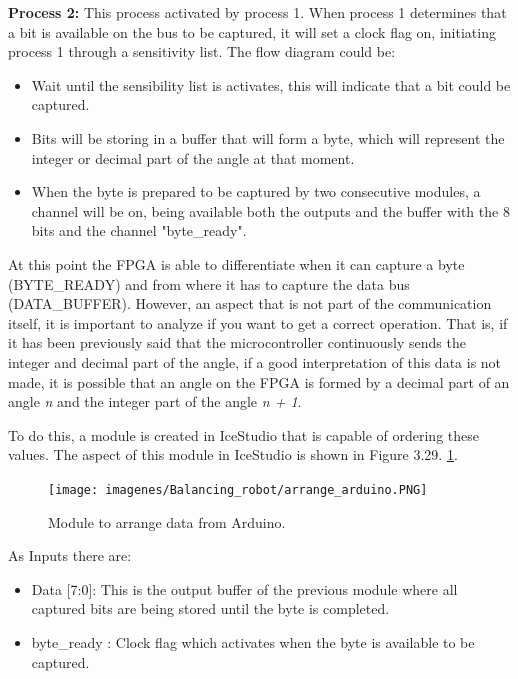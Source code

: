 \textbf{Process 2:} This process activated by process 1. When process 1 determines that a bit is available on the bus to be captured, it will set a clock flag on, initiating process 1 through a sensitivity list. The flow diagram could be:

\begin{itemize}
	\item Wait until the sensibility list is activates, this will indicate that a bit could be captured.
	\item Bits will be storing in a buffer that will form a byte, which will represent the integer or decimal part of the angle at that moment.
	\item When the byte is prepared to be captured by two consecutive modules, a channel will be on, being available both the outputs and the buffer with the 8 bits and the channel "byte\_ready".
\end{itemize}

At this point the FPGA is able to differentiate when it can capture a byte (BYTE\_READY) and from where it has to capture the data bus (DATA\_BUFFER). However, an aspect that is not part of the communication itself, it is important to analyze if you want to get a correct operation. That is, if it has been previously said that the microcontroller continuously sends the integer and decimal part of the angle, if a good interpretation of this data is not made, it is possible that an angle on the FPGA is formed by a decimal part of an angle \textit{n} and the integer part of the angle \textit{n + 1}.  \newline

To do this, a module is created in IceStudio that is capable of ordering these values. The aspect of this module in IceStudio is shown in Figure 3.29. \ref{fig:arrange_arduino}.

\begin{figure}[H]
	\center
	\texttt{[image: imagenes/Balancing\_robot/arrange\_arduino.PNG]}
	\caption{Module to arrange data from Arduino.}
	\label{fig:arrange_arduino}
\end{figure}

As Inputs there are:

\begin{itemize}
	\item Data [7:0]: This is the output buffer of the previous module where all captured bits are being stored until the byte is completed.
	\item byte\_ready : Clock flag which activates when the byte is available to be captured.
\end{itemize}

